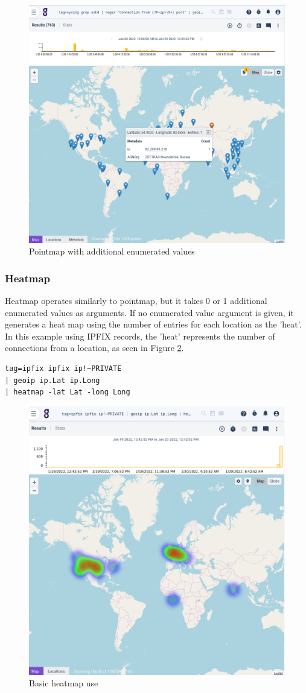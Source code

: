\begin{figure}
	\includegraphics[width=0.6\linewidth]{images/pointmap2.png}
	\caption{Pointmap with additional enumerated values}
	\label{fig:pointmap2}
\end{figure}


\subsubsection{Heatmap}

Heatmap operates similarly to pointmap, but it takes 0 or 1 additional
enumerated values as arguments. If no enumerated value argument is
given, it generates a heat map using the number of entries for each
location as the 'heat'. In this example using IPFIX records, the
'heat' represents the number of connections from a location, as seen
in Figure \ref{fig:heatmap-basic}.

\begin{Verbatim}[breaklines=true]
tag=ipfix ipfix ip!~PRIVATE 
| geoip ip.Lat ip.Long 
| heatmap -lat Lat -long Long
\end{Verbatim}

\begin{figure}
	\includegraphics[width=0.6\linewidth]{images/heatmap-basic.png}
	\caption{Basic heatmap use}
	\label{fig:heatmap-basic}
\end{figure}

